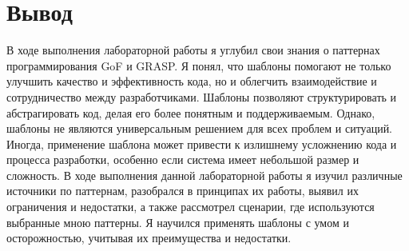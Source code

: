\documentclass[12pt,onecolumn]{article}
\begin{document}
\section{Вывод}
В ходе выполнения лабораторной работы я углубил свои знания о паттернах программирования GoF и GRASP. Я понял, что шаблоны помогают не только улучшить качество и эффективность кода, но и облегчить взаимодействие и сотрудничество между разработчиками. Шаблоны позволяют структурировать и абстрагировать код, делая его более понятным и поддерживаемым. Однако, шаблоны не являются универсальным решением для всех проблем и ситуаций. Иногда, применение шаблона может привести к излишнему усложнению кода и процесса разработки, особенно если система имеет небольшой размер и сложность.
В ходе выполнения данной лабораторной работы я изучил различные источники по паттернам, разобрался в принципах их работы, выявил их ограничения и недостатки, а также рассмотрел сценарии, где используются выбранные мною паттерны.
Я научился применять шаблоны с умом и осторожностью, учитывая их преимущества и недостатки. 
\end{document}

